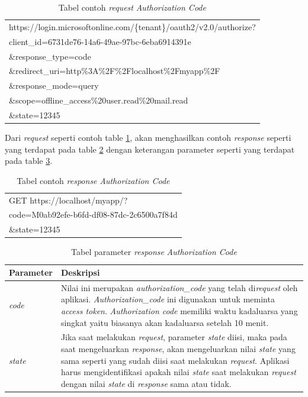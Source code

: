 \begin{table}[H]
	\centering 
	\caption{Tabel contoh \textit{request} \textit{Authorization Code}}
	\label{tab:contoh_request_authorization_code}
	\begin{tabular}{|p{12cm}|}
	\toprule
	https://login.microsoftonline.com/\{tenant\}/oauth2/v2.0/authorize?\\
client\_id=6731de76-14a6-49ae-97bc-6eba6914391e\\
\&response\_type=code\\
\&redirect\_uri=http\%3A\%2F\%2Flocalhost\%2Fmyapp\%2F\\
\&response\_mode=query\\
\&scope=offline\_access\%20user.read\%20mail.read\\
\&state=12345\\
	\bottomrule
\end{tabular}  
\end{table}

Dari \textit{request} seperti contoh table \ref{tab:contoh_request_authorization_code}, akan menghasilkan contoh \textit{response} seperti yang terdapat pada table \ref{tab:contoh_response_authorization_code} dengan keterangan parameter seperti yang terdapat pada table \ref{tab:parameter_response_authorization_code}. 

\begin{table}[H]
	\centering 
	\caption{Tabel contoh \textit{response} \textit{Authorization Code}}
	\label{tab:contoh_response_authorization_code}
	\begin{tabular}{|p{9cm}|}
	\toprule
	GET https://localhost/myapp/?\\
code=M0ab92efe-b6fd-df08-87dc-2c6500a7f84d\\
\&state=12345 \\
	\bottomrule
\end{tabular}  
\end{table}

\begin{table}[H]
	\centering 
	\caption{Tabel parameter \textit{response} \textit{Authorization Code}}
	\label{tab:parameter_response_authorization_code}
	\begin{tabular}{|p{3cm}|p{9cm}|}
	\toprule
	\textbf{Parameter} & \textbf{Deskripsi}\\ \hline 
	\textit{code} & Nilai ini merupakan \textit{authorization\_code} yang telah di\textit{request} oleh aplikasi. \textit{Authorization\_code} ini digunakan untuk meminta \textit{access token}. \textit{Authorization code} memiliki waktu kadaluarsa yang singkat yaitu biasanya akan kadaluarsa setelah 10 menit. \\ \hline 
	\textit{state} & Jika saat melakukan \textit{request}, parameter \textit{state} diisi, maka pada saat mengeluarkan \textit{response}, akan mengeluarkan nilai \textit{state} yang sama seperti yang sudah diisi saat melakukan \textit{request}. Aplikasi harus mengidentifikasi apakah nilai \textit{state} saat melakukan \textit{request} dengan nilai \textit{state} di \textit{response} sama atau tidak. \\ \bottomrule
\end{tabular}  
\end{table}

